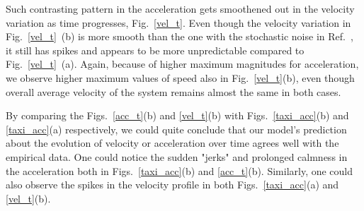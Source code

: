 \documentclass[conference]{IEEEtran}
\begin{document}
Such contrasting pattern in the acceleration gets smoothened out in
the velocity variation as time progresses, Fig.~\ref{vel_t}. Even
though the velocity variation in Fig.~\ref{vel_t}~(b) is more smooth
than the one with the stochastic noise in Ref.~\cite{Majith2016}, it still
has spikes and appears to be more unpredictable compared to
Fig.~\ref{vel_t}~(a). 
Again, because of higher maximum magnitudes for acceleration, we
observe higher maximum values of speed also in Fig.~\ref{vel_t}(b), even though overall average velocity of the system remains almost the same in both cases.


By comparing the Figs.~\ref{acc_t}(b) and \ref{vel_t}(b) with Figs.~\ref{taxi_acc}(b) and \ref{taxi_acc}(a) respectively, we could quite conclude that our model's prediction about the evolution of velocity or acceleration over time agrees well with the empirical data. One could notice the sudden "jerks" and prolonged calmness in the acceleration both in Figs.~\ref{taxi_acc}(b) and \ref{acc_t}(b). Similarly, one could also observe the spikes in the velocity profile in both Figs.~\ref{taxi_acc}(a) and \ref{vel_t}(b).

\end{document}
